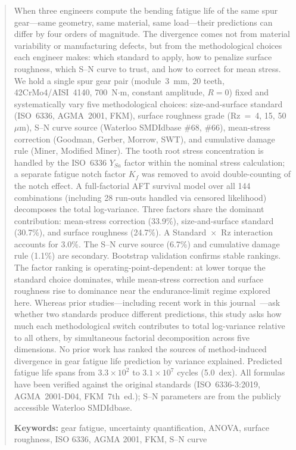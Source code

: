 \documentclass[12pt,a4paper]{article}
\begin{document}
\begin{abstract}
\label{sec:abstract}

When three engineers compute the bending fatigue life of the same spur
gear---same geometry, same material, same load---their predictions can
differ by four orders of magnitude. The divergence comes not from
material variability or manufacturing defects, but from the
methodological choices each engineer makes: which standard to apply, how
to penalize surface roughness, which S--N curve to trust, and how to
correct for mean stress. We hold a single spur gear pair
(module~3~mm,%
20 teeth,%
42CrMo4/AISI~4140,%
700~N$\cdot$m,%
constant amplitude, $R=0$) fixed and systematically vary five methodological%
choices: size-and-surface standard (ISO~6336, AGMA~2001, FKM), surface
roughness grade (Rz~=~4, 15, 50~$\mu$m), S--N curve source (Waterloo
SMDIdbase \#68, \#66), mean-stress correction (Goodman, Gerber, Morrow,
SWT), and cumulative damage rule (Miner, Modified Miner). The tooth
root stress concentration is handled by the ISO~6336 $Y_{Sa}$ factor
within the nominal stress calculation; a separate fatigue notch factor
$K_f$ was removed to avoid double-counting of the notch effect. A
full-factorial AFT survival model over all 144 combinations (including
28 run-outs handled via censored likelihood) decomposes the total
log-variance. Three factors share the dominant contribution: mean-stress
correction (33.9\%), size-and-surface standard (30.7\%), and surface
roughness (24.7\%). A Standard~$\times$~Rz interaction accounts for
3.0\%. The S--N curve source (6.7\%) and cumulative damage rule (1.1\%)
are secondary. Bootstrap validation confirms stable
rankings.%
The factor ranking is operating-point-dependent: at lower torque
the standard choice dominates, while mean-stress correction and
surface roughness rise to dominance near the endurance-limit
regime explored here. Whereas prior studies---including recent work in this
journal~\cite{bonaiti2024}---ask whether two standards produce different
predictions, this study asks how much each methodological switch contributes
to total log-variance relative to all others, by simultaneous factorial
decomposition across five dimensions. No prior work has ranked the
sources of method-induced divergence in gear fatigue life prediction by
variance explained. Predicted fatigue life spans from $3.3\times10^2$ to
$3.1\times10^7$ cycles (5.0~dex).%
All formulas have been verified against the original standards (ISO~6336-3:2019, AGMA~2001-D04,
FKM~7th~ed.); S--N parameters are from the publicly accessible Waterloo
SMDIdbase.

\textbf{Keywords:} gear fatigue, uncertainty quantification, ANOVA,
surface roughness, ISO 6336, AGMA 2001, FKM, S--N curve
\end{abstract}
\end{document}
